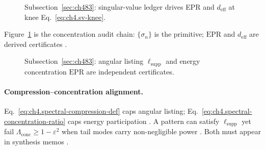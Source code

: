 \begin{figure}[t]
\centering
{}
\caption{Subsection~\ref{sec:ch483}: singular-value ledger drives EPR and \(d_{\mathrm{eff}}\) at knee Eq.~\eqref{eq:ch4.sv-knee}.}
\label{fig:ch4.spectral-concentration}
\end{figure}

Figure~\ref{fig:ch4.spectral-concentration} is the concentration audit chain: \(\{\sigma_{n}\}\) is the primitive; \(\mathrm{EPR}\) and
\(d_{\mathrm{eff}}\) are derived certificates \cite{harrington2001,hansen1988,stratton1941}.

\begin{figure}[t]
\centering
{}
\caption{Subsection~\ref{sec:ch483}: angular listing \(\ell_{\mathrm{supp}}\) and energy concentration \(\mathrm{EPR}\) are independent certificates.}
\label{fig:ch4.listing-concentration-split}
\end{figure}

\paragraph{Compression--concentration alignment.}
Eq.~\eqref{eq:ch4.spectral-compression-def} caps angular listing; Eq.~\eqref{eq:ch4.spectral-concentration-ratio} caps energy participation
\cite{hansen1988,stratton1941,harrington2001}. A pattern can satisfy \(\ell_{\mathrm{supp}}\) yet fail \(\Lambda_{\mathrm{conc}}\ge1-\varepsilon^{2}\) when
tail modes carry non-negligible power \cite{devaney2004}. Both must appear in synthesis memos \cite{stratton1941}.

